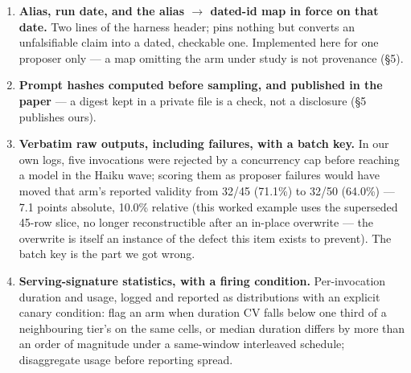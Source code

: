 \begin{enumerate}
\item \textbf{Alias, run date, and the alias $\to$ dated-id map in force on that date.} Two lines of the harness header; pins nothing but converts an unfalsifiable claim into a dated, checkable one. Implemented here for one proposer only --- a map omitting the arm under study is not provenance (\S5).
\item \textbf{Prompt hashes computed before sampling, and published in the paper} --- a digest kept in a private file is a check, not a disclosure (\S5 publishes ours).
\item \textbf{Verbatim raw outputs, including failures, with a batch key.} In our own logs, five invocations were rejected by a concurrency cap before reaching a model in the Haiku wave; scoring them as proposer failures would have moved that arm's reported validity from 32/45 (71.1\%) to 32/50 (64.0\%) --- 7.1 points absolute, 10.0\% relative (this worked example uses the superseded 45-row slice, no longer reconstructible after an in-place overwrite --- the overwrite is itself an instance of the defect this item exists to prevent). The batch key is the part we got wrong.
\item \textbf{Serving-signature statistics, with a firing condition.} Per-invocation duration and usage, logged and reported as distributions with an explicit canary condition: flag an arm when duration CV falls below one third of a neighbouring tier's on the same cells, or median duration differs by more than an order of magnitude under a same-window interleaved schedule; disaggregate usage before reporting spread.


\end{enumerate}
